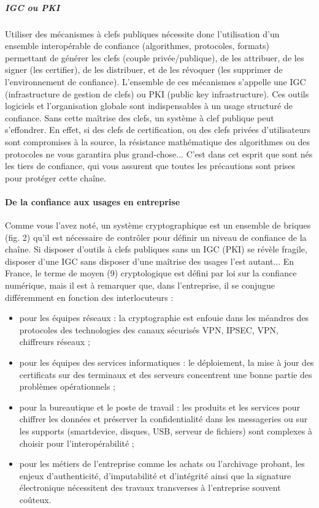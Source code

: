 \subparagraph{IGC ou PKI}

Utiliser des mécanismes à clefs publiques nécessite donc l'utilisation d'un ensemble interopérable de confiance (algorithmes, protocoles, formats) permettant de générer les clefs (couple privée/publique), de les attribuer, de les signer (les certifier), de les distribuer, et de les révoquer (les supprimer de l'environnement de confiance). L'ensemble de ces mécanismes s'appelle une IGC (infrastructure de gestion de clefs) ou PKI (public key infrastructure). Ces outils logiciels et l'organisation globale sont indispensables à un usage structuré de confiance. Sans cette maîtrise des clefs, un système à clef publique peut s'effondrer. En effet, si des clefs de certification, ou des clefs privées d'utilisateurs sont compromises à la source, la résistance mathématique des algorithmes ou des protocoles ne vous garantira plus grand-chose... C'est dans cet esprit que sont nés les tiers de confiance, qui vous assurent que toutes les précautions sont prises pour protéger cette chaîne.



\paragraph{De la confiance aux usages en entreprise}
Comme vous l'avez noté, un système cryptographique est un ensemble de briques (fig. 2) qu'il est nécessaire de contrôler pour définir un niveau de confiance de la chaîne. Si disposer d'outils à clefs publiques sans un IGC (PKI) se révèle fragile, disposer d'une IGC sans disposer d'une maîtrise des usages l'est autant...
En France, le terme de moyen (9) cryptologique est défini par loi sur la confiance numérique, mais il est à remarquer que, dans l'entreprise, il se conjugue différemment en fonction des interlocuteurs :


\begin{itemize}
 \item pour les équipes réseaux : la cryptographie est enfouie dans les méandres des protocoles des technologies des canaux sécurisés VPN, IPSEC, VPN, chiffreurs réseaux ;
 \item pour les équipes des services informatiques : le déploiement, la mise à jour des certificats sur des terminaux et des serveurs concentrent une bonne partie des problèmes opérationnels ;
 \item pour la bureautique et le poste de travail : les produits et les services pour chiffrer les données et préserver la confidentialité dans les messageries ou sur les supports (smartdevice, disques, USB, serveur de fichiers) sont complexes à choisir pour l'interopérabilité ;
 \item pour les métiers de l'entreprise comme les achats ou l'archivage probant, les enjeux d'authenticité, d'imputabilité et d'intégrité ainsi que la signature électronique nécessitent des travaux transverses à l'entreprise souvent coûteux.
\end{itemize}

